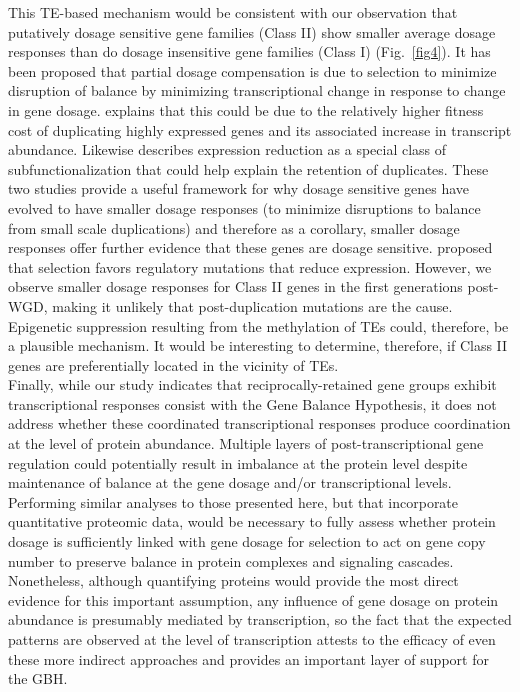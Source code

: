 \documentclass[11pt]{article}
\begin{document}
This TE-based mechanism would be consistent with our observation that putatively dosage sensitive gene families (Class II) show smaller average dosage responses than do dosage insensitive gene families (Class I) (Fig.~\ref{fig4}).
It has been proposed that partial dosage compensation is due to selection to minimize disruption of balance by minimizing transcriptional change in response to change in gene dosage.
\cite{katju2018} explains that this could be due to the relatively higher fitness cost of duplicating highly expressed genes and its associated increase in transcript abundance.
Likewise \cite{qian2010} describes expression reduction as a special class of subfunctionalization that could help explain the retention of duplicates.
These two studies provide a useful framework for why dosage sensitive genes have evolved to have smaller dosage responses (to minimize disruptions to balance from small scale duplications) and therefore as a corollary, smaller dosage responses offer further evidence that these genes are dosage sensitive.
\cite{qian2010} proposed that selection favors regulatory mutations that reduce expression.
However, we observe smaller dosage responses for Class II genes in the first generations post-WGD, making it unlikely that post-duplication mutations are the cause.
Epigenetic suppression resulting from the methylation of TEs could, therefore, be a plausible mechanism.
It would be interesting to determine, therefore, if Class II genes are preferentially located in the vicinity of TEs.\\

Finally, while our study indicates that reciprocally-retained gene groups exhibit transcriptional responses consist with the Gene Balance Hypothesis, it does not address whether these coordinated transcriptional responses produce coordination at the level of protein abundance.
Multiple layers of post-transcriptional gene regulation could potentially result in imbalance at the protein level despite maintenance of balance at the gene dosage and/or transcriptional levels.
Performing similar analyses to those presented here, but that incorporate quantitative proteomic data, would be necessary to fully assess whether protein dosage is sufficiently linked with gene dosage for selection to act on gene copy number to preserve balance in protein complexes and signaling cascades.
Nonetheless, although quantifying proteins would provide the most direct evidence for this important assumption, any influence of gene dosage on protein abundance is presumably mediated by transcription, so the fact that the expected patterns are observed at the level of transcription attests to the efficacy of even these more indirect approaches and provides an important layer of support for the GBH.\\
\end{document}
